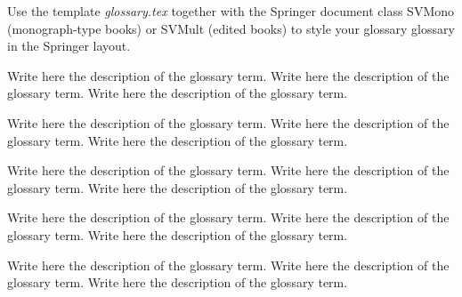 %
%



Use the template \emph{glossary.tex} together with the Springer document class SVMono (monograph-type books) or SVMult (edited books) to style your glossary glossary in the Springer layout.


 Write here the description of the glossary term. Write here the description of the glossary term. Write here the description of the glossary term.

 Write here the description of the glossary term. Write here the description of the glossary term. Write here the description of the glossary term.

 Write here the description of the glossary term. Write here the description of the glossary term. Write here the description of the glossary term.

 Write here the description of the glossary term. Write here the description of the glossary term. Write here the description of the glossary term.

 Write here the description of the glossary term. Write here the description of the glossary term. Write here the description of the glossary term.